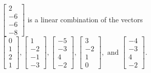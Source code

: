\begin{exercise}
\begin{exerciseStatement}
  \end{exerciseStatement}
  \begin{exerciseAnswer}
   \(\left[\begin{array}{c}
2 \\
-6 \\
-6 \\
-8
\end{array}\right]\) 
  	 is  
	a linear combination of the vectors \(\left[\begin{array}{c}
0 \\
1 \\
2 \\
1
\end{array}\right] , \left[\begin{array}{c}
1 \\
-2 \\
-1 \\
-3
\end{array}\right] , \left[\begin{array}{c}
-5 \\
-3 \\
4 \\
-2
\end{array}\right] , \left[\begin{array}{c}
3 \\
-2 \\
1 \\
0
\end{array}\right] , \text{ and } \left[\begin{array}{c}
-4 \\
-3 \\
4 \\
-2
\end{array}\right]\).

	
  


  \end{exerciseAnswer}
\end{exercise}